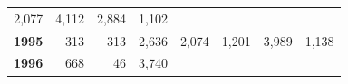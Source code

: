 \documentclass[]{article}
\begin{document}
\begin{longtable}[]{@{}rrrrrrrr@{}}
\begin{minipage}[t]{0.14\columnwidth}
2,077\strut
\end{minipage} & \begin{minipage}[t]{0.09\columnwidth}\raggedleft\strut
4,112\strut
\end{minipage} & \begin{minipage}[t]{0.08\columnwidth}\raggedleft\strut
2,884\strut
\end{minipage} & \begin{minipage}[t]{0.10\columnwidth}\raggedleft\strut
1,102\strut
\end{minipage}\tabularnewline
\begin{minipage}[t]{0.08\columnwidth}\raggedleft\strut
\textbf{1995}\strut
\end{minipage} & \begin{minipage}[t]{0.10\columnwidth}\raggedleft\strut
313\strut
\end{minipage} & \begin{minipage}[t]{0.11\columnwidth}\raggedleft\strut
313\strut
\end{minipage} & \begin{minipage}[t]{0.08\columnwidth}\raggedleft\strut
2,636\strut
\end{minipage} & \begin{minipage}[t]{0.14\columnwidth}\raggedleft\strut
2,074\strut
\end{minipage} & \begin{minipage}[t]{0.09\columnwidth}\raggedleft\strut
1,201\strut
\end{minipage} & \begin{minipage}[t]{0.08\columnwidth}\raggedleft\strut
3,989\strut
\end{minipage} & \begin{minipage}[t]{0.10\columnwidth}\raggedleft\strut
1,138\strut
\end{minipage}\tabularnewline
\begin{minipage}[t]{0.08\columnwidth}\raggedleft\strut
\textbf{1996}\strut
\end{minipage} & \begin{minipage}[t]{0.10\columnwidth}\raggedleft\strut
668\strut
\end{minipage} & \begin{minipage}[t]{0.11\columnwidth}\raggedleft\strut
46\strut
\end{minipage} & \begin{minipage}[t]{0.08\columnwidth}\raggedleft\strut
3,740\strut
\end{minipage} & \begin{minipage}[t]{0.14\columnwidth}\raggedleft\strut

\end{minipage}
\end{longtable}
\end{document}
